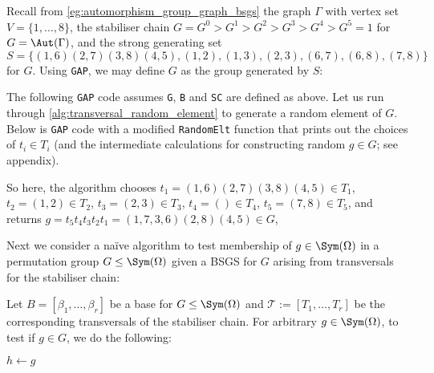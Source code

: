 \begin{example}\label{eg:automorphism_group_graph_random}
    Recall from \autoref{eg:automorphism_group_graph_bsgs} the graph $\Gamma$ with vertex set $V = \{1,\dotsc,8\}$, the stabiliser chain $G = G^0 > G^1 > G^2 > G^3 > G^4 > G^5 = 1$ for $G = \Aut(\Gamma)$, and the strong generating set
    $$S = \{(1,6)(2,7)(3,8)(4,5),(1,2),(1,3),(2,3),(6,7),(6,8),(7,8)\}$$
    for $G$. Using \texttt{GAP}, we may define $G$ as the group generated by $S$:

    

    The following \texttt{GAP} code assumes \texttt{G}, \texttt{B} and \texttt{SC} are defined as above. Let us run through \autoref{alg:transversal_random_element} to generate a random element of $G$. Below is \texttt{GAP} code with a modified \texttt{RandomElt} function that prints out the choices of $t_i \in T_i$ (and the intermediate calculations for constructing random $g \in G$; see appendix).

    

    So here, the algorithm chooses $t_1 = (1,6)(2,7)(3,8)(4,5) \in T_1$, $t_2 = (1,2) \in T_2$, $t_3 = (2,3) \in T_3$, $t_4 = () \in T_4$, $t_5 = (7,8) \in T_5$, and returns $g = t_5 t_4 t_3 t_2 t_1 = (1,7,3,6)(2,8)(4,5) \in G$, 
\end{example}

Next we consider a na\"ive algorithm to test membership of $g \in \Sym(\Omega)$ in a permutation group $G \leq \Sym(\Omega)$ given a BSGS for $G$ arising from transversals for the stabiliser chain:

\begin{algorithm}\label{alg:transversal_membership_test}
    Let $B = [\beta_1,\dotsc,\beta_r]$ be a base for $G \leq \Sym(\Omega)$ and $\mathcal{T} := [T_1,\dotsc,T_r]$ be the corresponding transversals of the stabiliser chain. For arbitrary $g \in \Sym(\Omega)$, to test if $g \in G$, we do the following:

    \begin{algorithmic}[1]
        \State $h \gets g$
        \EndFor
        \EndProcedure
    \end{algorithmic}
\end{algorithm}

